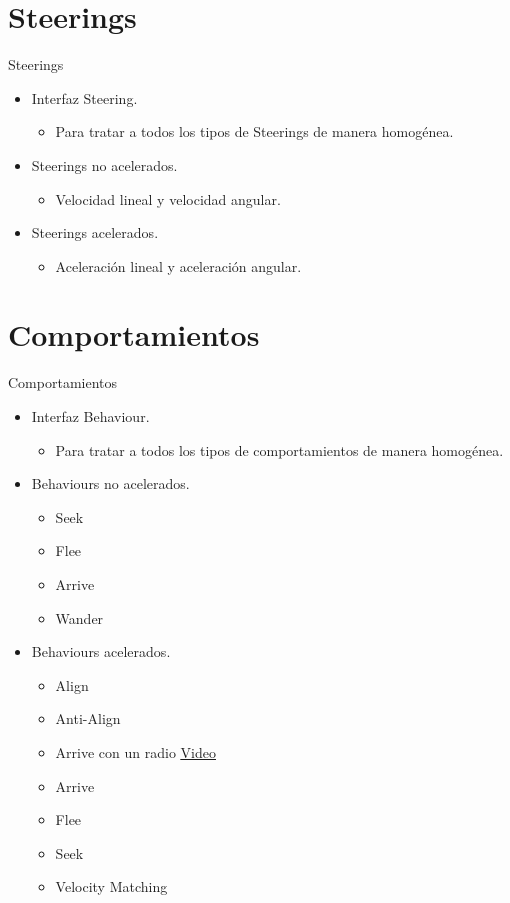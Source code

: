 \documentclass[10pt]{beamer}
\begin{document}
\section{Steerings}
\begin{frame}{Steerings}
\begin{itemize}[<+- | alert@+>]
	\item Interfaz Steering.
	\begin{itemize}[<+- | alert@+>]
  		\item Para tratar a todos los tipos de Steerings de manera homogénea.
 	\end{itemize}
 	\item Steerings no acelerados.
 	\begin{itemize}[<+- | alert@+>]
  		\item Velocidad lineal y velocidad angular.
 	\end{itemize}
 	\item Steerings acelerados.
 	\begin{itemize}[<+- | alert@+>]
  		\item Aceleración lineal y aceleración angular.
 	\end{itemize}
\end{itemize}
\end{frame}

\section{Comportamientos}
\begin{frame}{Comportamientos}
\begin{itemize}[<+- | alert@+>]
	\item Interfaz Behaviour.
	\begin{itemize}[<+- | alert@+>]
  		\item Para tratar a todos los tipos de comportamientos de manera homogénea.
 	\end{itemize}
 	\item Behaviours no acelerados.
 	\begin{itemize}[<+- | alert@+>]
  		\item Seek \item Flee \item Arrive \item Wander 
 	\end{itemize}
 	\item Behaviours acelerados.
 	\begin{itemize}[<+- | alert@+>]
  		\item Align \item Anti-Align \item Arrive con un radio \href{videos/TestArrive\_Accelerated\_WithOneRadious.mp4}{\color{blue}\underline{Video}}
  		\item Arrive \item Flee \item Seek \item Velocity Matching
 	\end{itemize}
\end{itemize}
\end{frame}
\end{document}
